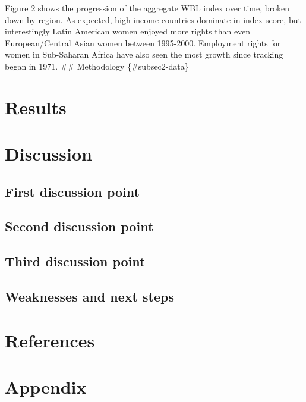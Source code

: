 \documentclass[
  letterpaper,
  DIV=11,
  numbers=noendperiod]{scrartcl}
\newlength{\cslhangindent}
\newenvironment{CSLReferences}[2] %
 {\begin{list}{}{%
  \setlength{\itemindent}{0pt}
  \setlength{\leftmargin}{0pt}
  \setlength{\parsep}{0pt}
  \ifodd #1
   \setlength{\leftmargin}{\cslhangindent}
   \setlength{\itemindent}{-1\cslhangindent}
  \fi
  \setlength{\itemsep}{#2\baselineskip}}}
 {\end{list}}
\begin{document}
Figure 2 shows the progression of the aggregate WBL index over time,
broken down by region. As expected, high-income countries dominate in
index score, but interestingly Latin American women enjoyed more rights
than even European/Central Asian women between 1995-2000. Employment
rights for women in Sub-Saharan Africa have also seen the most growth
since tracking began in 1971. \#\# Methodology \{\#subsec2-data\}

\section{Results}\label{sec-results}

\section{Discussion}\label{discussion}

\subsection{First discussion point}\label{sec-point1}

\subsection{Second discussion point}\label{sec-point2}

\subsection{Third discussion point}\label{sec-point3}

\subsection{Weaknesses and next steps}\label{weaknesses-and-next-steps}

\newpage

\section{References}\label{references}

\label{refs}
\begin{CSLReferences}{0}{1}
\end{CSLReferences}

\newpage

\appendix

\section*{Appendix}\label{appendix}
\end{document}

